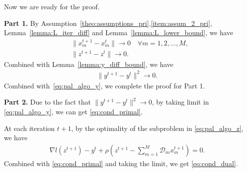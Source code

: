 Now we are ready for the proof.

{\bf Part 1. } By Assumption~\ref{theo:assumptions_pri}.\ref{item:assum_2_pri}, Lemma~\ref{lemma:L_iter_diff} and Lemma~\ref{lemma:L_lower_bound}, we have
\begin{align}
    & \|x_m^{t+1} - x_m^t\|\rightarrow 0\quad\forall m=1,2,\ldots, M,\nonumber\\
    & \|z^{t+1} - z^t\|\rightarrow 0.\nonumber
\end{align}
Combined with Lemma~\ref{lemma:y_diff_bound}, we have
\begin{align}
    \|y^{t+1}-y^t\|^2\rightarrow 0.\nonumber
\end{align}
Combined with~\eqref{eq:pal_algo_y}, we complete the proof for Part 1.

{\bf Part 2.} Due to the fact that $\|y^{t+1}-y^t\|^2\rightarrow 0$, by taking limit in \eqref{eq:pal_algo_y}, we can get \eqref{eq:cond_primal}.

At each iteration $t+1$, by the optimality of the subproblem in \eqref{eq:pal_algo_z}, we have
\begin{align}
    \nabla l(z^{t+1}) - y^t + \rho (z^{t+1} - \sum_{m=1}^{M}\mathcal{D}_mx_m^{t+1}) = 0.
\end{align}
Combined with \eqref{eq:cond_primal} and taking the limit, we get \eqref{eq:cond_dual}.

